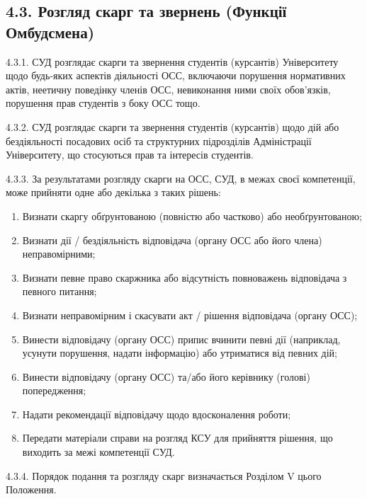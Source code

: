 \subsection*{4.3. Розгляд скарг та звернень (Функції Омбудсмена)}
    4.3.1. СУД розглядає скарги та звернення студентів (курсантів) Університету щодо будь-яких аспектів діяльності ОСС, включаючи порушення нормативних актів, неетичну поведінку членів ОСС, невиконання ними своїх обов'язків, порушення прав студентів з боку ОСС тощо.

    4.3.2. СУД розглядає скарги та звернення студентів (курсантів) щодо дій або бездіяльності посадових осіб та структурних підрозділів Адміністрації Університету, що стосуються прав та інтересів студентів.


    4.3.3. За результатами розгляду скарги на ОСС, СУД, в межах своєї компетенції, може прийняти одне або декілька з таких рішень:

        \begin{enumerate}[label=\alph*)]
            \item Визнати скаргу обґрунтованою (повністю або частково) або необґрунтованою;
            \item Визнати дії / бездіяльність відповідача (органу ОСС або його члена) неправомірними;
            \item Визнати певне право скаржника або відсутність повноважень відповідача з певного питання;
            \item Визнати неправомірним і скасувати акт / рішення відповідача (органу ОСС);
            \item Винести відповідачу (органу ОСС) припис вчинити певні дії (наприклад, усунути порушення, надати інформацію) або утриматися від певних дій;
            \item Винести відповідачу (органу ОСС) та/або його керівнику (голові) попередження;
            \item Надати рекомендації відповідачу щодо вдосконалення роботи;
            \item Передати матеріали справи на розгляд КСУ для прийняття рішення, що виходить за межі компетенції СУД.
        \end{enumerate}

    4.3.4. Порядок подання та розгляду скарг визначається Розділом V цього Положення.

